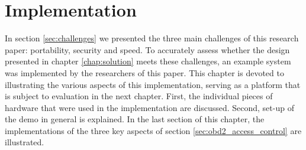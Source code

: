 
\chapter{Implementation}
\label{chap:implementation}

In section \ref{sec:challenges} we presented the three main challenges of this research paper: portability, security and speed. To accurately assess whether the design presented in chapter \ref{chap:solution} meets these challenges, an example system was implemented by the researchers of this paper. This chapter is devoted to illustrating the various aspects of this implementation, serving as a platform that is subject to evaluation in the next chapter. First, the individual pieces of hardware that were used in the implementation are discussed. Second, set-up of the demo in general is explained. In the last section of this chapter, the implementations of the three key aspects of section \ref{sec:obd2_access_control} are illustrated.

